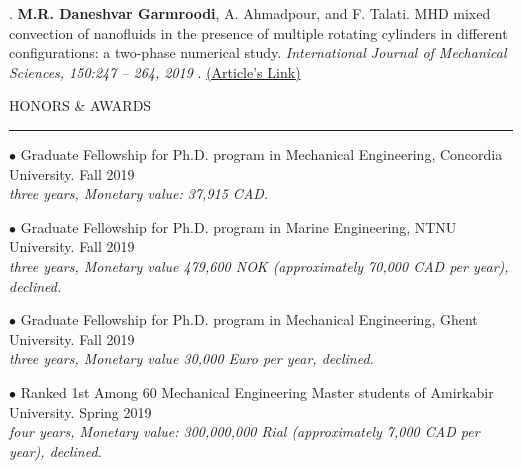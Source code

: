 \documentclass[11pt]{article}
\begin{document}
		. {\textbf{M.R. Daneshvar Garmroodi}, A. Ahmadpour, and F. Talati. MHD mixed convection
			of nanofluids in the presence of multiple rotating cylinders in different configurations:
			a two-phase numerical study.\textit{ International Journal of Mechanical Sciences, 150:247
				– 264, 2019} . \href{https://www.sciencedirect.com/science/article/pii/S0020740318309251?via3Dihub}{({Article's Link})}}
		
		
		\vspace{1.5mm}
		
		\noindent HONORS \& AWARDS
		
		\vspace{-2mm}
		
		\noindent\rule[0.5ex]{\linewidth}{1pt}
		
		{\noindent $\bullet$ Graduate Fellowship for Ph.D. program in Mechanical Engineering, Concordia University.} \hfill {Fall 2019} 
		\\ \textit{three years, Monetary value: 37,915 CAD.}
		
		\vspace{1mm}
		
		{\noindent $\bullet$ Graduate Fellowship for Ph.D. program in Marine Engineering, NTNU University.} \hfill {Fall 2019} 
		\\ \textit{three years, Monetary value 479,600 NOK (approximately 70,000 CAD per year), declined.}
		\vspace{1.5mm}
		
		{\noindent $\bullet$ Graduate Fellowship for Ph.D. program in Mechanical Engineering, Ghent University.} \hfill {Fall 2019} 
		\\ \textit{three years, Monetary value 30,000 Euro per year, declined.}
		\vspace{1.5mm}
		
		{\noindent $\bullet$ Ranked 1st Among 60 Mechanical Engineering Master students of Amirkabir University.} \hfill {Spring 2019} 
		\\ \textit{four years, Monetary value: 300,000,000 Rial (approximately 7,000 CAD per year), declined.}
		\vspace{1.5mm}
		
\end{document}
